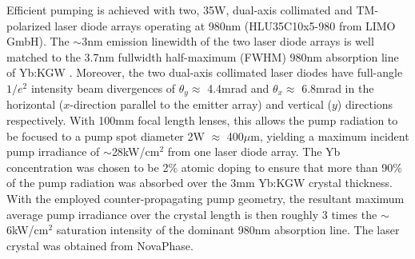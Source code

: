 
Efficient pumping is achieved with two, 35W, dual-axis collimated and TM-polarized laser diode arrays operating at 980nm (HLU35C10x5-980 from LIMO GmbH\cite{website_limo}).
The $\sim$3nm emission linewidth of the two laser diode arrays is well matched to the 3.7nm fullwidth half-maximum (FWHM) 980nm absorption line of Yb:KGW \cite{Paunescu_diode_2004,Biswal_thermo_optical_05,website_EKSPLA}.
Moreover, the two dual-axis collimated laser diodes have full-angle $1/e^2$ intensity beam divergences of $\theta_y \approx$ 4.4mrad and $\theta_x \approx$ 6.8mrad in the horizontal ($x$-direction parallel to the emitter array) and vertical ($y$) directions respectively. 
With 100mm focal length lenses, this allows the pump radiation to be focused to a pump spot diameter 2W $\approx$ 400$\mu$m, yielding a maximum incident pump irradiance of $\sim$28kW/cm$^2$ from one laser diode array.
The Yb concentration was chosen to be 2\% atomic doping to ensure that more than 90\% of the pump radiation was absorbed over the 3mm Yb:KGW crystal thickness.
With the employed counter-propagating pump geometry, the resultant maximum average pump irradiance over the crystal length is then roughly 3 times the $\sim$6kW/cm$^2$ saturation intensity of the dominant 980nm absorption line\cite{Brunner_powerful_2004}.
The laser crystal was obtained from NovaPhase\cite{website_nova}.

